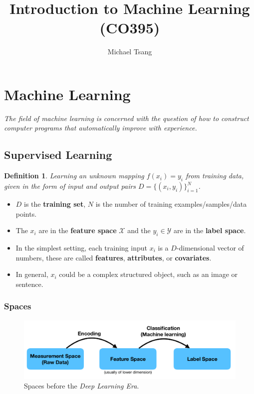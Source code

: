 \documentclass[11pt]{article}
\title{Introduction to Machine Learning (CO395)}
\author{Michael Tsang}
\newtheorem{defn}{Definition}
\begin{document}
\maketitle
\section{Machine Learning}
\textit{The field of machine learning is concerned with the question of how to construct computer programs that automatically improve with experience.}

\subsection{Supervised Learning}
\begin{defn}
Learning an unknown mapping $f(x_i) = y_i$ from training data, given in the form of input  and output pairs $D = \{ (x_i, y_i) \}^N_{i = 1}$.
\end{defn}

\begin{itemize}
  \item $D$ is the \textbf{training set}, $N$ is the number of training examples/samples/data points. 
  \item The $x_i$ are in the \textbf{feature space} $\mathcal{X}$ and the $y_i \in \mathcal{Y}$ are in the \textbf{label space}.
  \item In the simplest setting, each training input $x_i$ is a $D$-dimensional vector of numbers, these are called \textbf{features}, \textbf{attributes}, or \textbf{covariates}.
  \item In general, $x_i$ could be a complex structured object, such as an image or sentence.
\end{itemize}

\subsubsection{Spaces}
\begin{figure}[h]
  \caption{Spaces before the \textit{Deep Learning Era}.}
  \includegraphics[scale=0.2]{spacesbefore}
  \centering
\end{figure}
\end{document}
